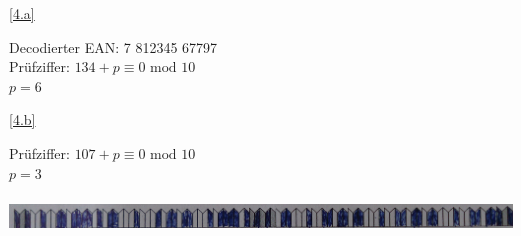 \documentclass[a4paper, margins=2cm]{homework}
\begin{document}
\begin{problem}
\end{problem}

\begin{solution}
	\ref{4.a}
	\begin{center}
		Decodierter EAN: 7 812345 67797 \\

		Prüfziffer: $134 + p \equiv 0 \text{ mod } 10$ \\

		$p = 6$
	\end{center}
	
	\ref{4.b}
	\begin{center}
		Prüfziffer: $107 + p \equiv 0 \text{ mod } 10$ \\

		$p = 3$
	\end{center}
	\begin{center}
		\includegraphics[height=1cm, width=16.5cm]{EANbearbeitet.jpg}
	\end{center}
\end{solution}
\end{document}
